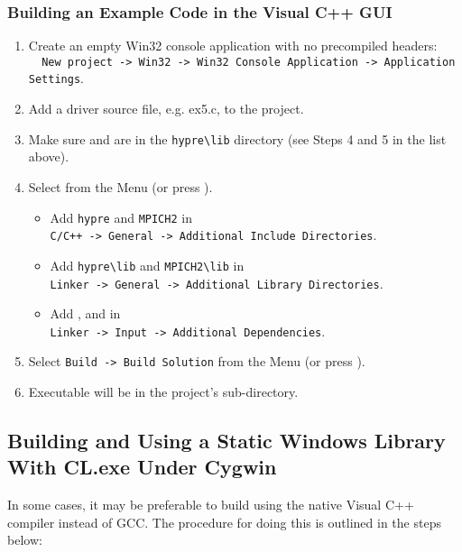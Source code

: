 \subsubsection{Building an Example Code in the Visual C++ GUI}
\begin{enumerate}
\item Create an empty Win32 console application with no precompiled headers: \\
\verb|  New project -> Win32 -> Win32 Console Application -> Application Settings|.
\item Add a driver source file, e.g. ex5.c, to the project.
\item Make sure  and  are in the \verb|hypre\lib|
directory (see Steps 4 and 5 in the  list above).
\item Select  from the Menu (or press ).
\begin{itemize}
\item
  Add \verb|hypre| and \verb|MPICH2| in \\
  \verb|C/C++ -> General -> Additional Include Directories|.
\item
  Add \verb|hypre\lib| and \verb|MPICH2\lib| in \\
  \verb|Linker -> General -> Additional Library Directories|.
\item
  Add ,  and  in \\
  \verb|Linker -> Input -> Additional Dependencies|.
\end{itemize}
\item Select \verb|Build -> Build Solution| from the Menu (or press ).
\item Executable will be in the project's  sub-directory.
\end{enumerate}

\subsection{Building and Using a Static Windows Library With CL.exe Under Cygwin}

In some cases, it may be preferable to build \hypre{} using the native Visual
C++ compiler instead of GCC. The procedure for doing this is outlined in the
steps below:

